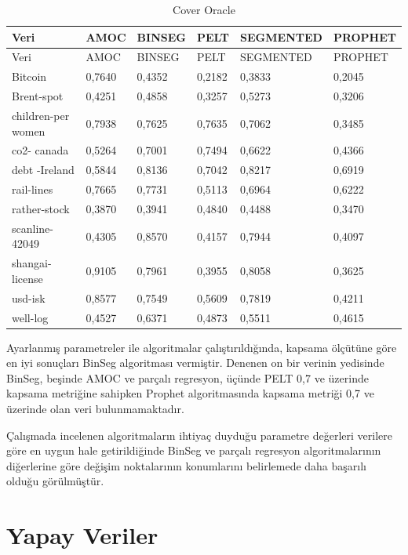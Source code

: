 \documentclass[12pt,twoside]{deuthesis}
\begin{document}
\begin{longtable}[]{@{}llllll@{}}
\caption{\label{tab:nvar6} Cover Oracle}\tabularnewline
\toprule\noalign{}
Veri & AMOC & BINSEG & PELT & SEGMENTED & PROPHET \\
\midrule\noalign{}
\endfirsthead
\toprule\noalign{}
Veri & AMOC & BINSEG & PELT & SEGMENTED & PROPHET \\
\midrule\noalign{}
\endhead
\bottomrule\noalign{}
\endlastfoot
Bitcoin & 0,7640 & 0,4352 & 0,2182 & 0,3833 & 0,2045 \\
Brent-spot & 0,4251 & 0,4858 & 0,3257 & 0,5273 & 0,3206 \\
children-per women & 0,7938 & 0,7625 & 0,7635 & 0,7062 & 0,3485 \\
co2- canada & 0,5264 & 0,7001 & 0,7494 & 0,6622 & 0,4366 \\
debt -Ireland & 0,5844 & 0,8136 & 0,7042 & 0,8217 & 0,6919 \\
rail-lines & 0,7665 & 0,7731 & 0,5113 & 0,6964 & 0,6222 \\
rather-stock & 0,3870 & 0,3941 & 0,4840 & 0,4488 & 0,3470 \\
scanline-42049 & 0,4305 & 0,8570 & 0,4157 & 0,7944 & 0,4097 \\
shangai-license & 0,9105 & 0,7961 & 0,3955 & 0,8058 & 0,3625 \\
usd-isk & 0,8577 & 0,7549 & 0,5609 & 0,7819 & 0,4211 \\
well-log & 0,4527 & 0,6371 & 0,4873 & 0,5511 & 0,4615 \\
\end{longtable}

Ayarlanmış parametreler ile algoritmalar çalıştırıldığında, kapsama ölçütüne göre en iyi sonuçları BinSeg algoritması vermiştir. Denenen on bir verinin yedisinde BinSeg, beşinde AMOC ve parçalı regresyon, üçünde PELT 0,7 ve üzerinde kapsama metriğine sahipken Prophet algoritmasında kapsama metriği 0,7 ve üzerinde olan veri bulunmamaktadır.

Çalışmada incelenen algoritmaların ihtiyaç duyduğu parametre değerleri verilere göre en uygun hale getirildiğinde BinSeg ve parçalı regresyon algoritmalarının diğerlerine göre değişim noktalarının konumlarını belirlemede daha başarılı olduğu görülmüştür.

\hypertarget{yapay-veriler}{%
\section{Yapay Veriler}\label{yapay-veriler}}
\end{document}
